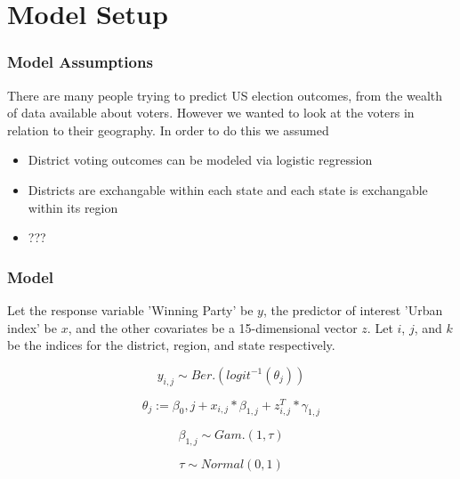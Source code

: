 \documentclass{beamer}
\begin{document}




\section{Model Setup}
\begin{frame}
  \frametitle{Model Assumptions}
  There are many people trying to predict US election outcomes, from the wealth of data available about voters. However we wanted to look at the voters in relation to their geography. In order to do this we assumed 
  \begin{itemize}
    \item District voting outcomes can be modeled via logistic regression 
    \item Districts are exchangable within each state and each state is exchangable within its region
    \item ??? 
  \end{itemize}
  \end{frame}

\begin{frame}
\frametitle{Model}
Let the response variable 'Winning Party' be \(y\), the predictor of interest 'Urban index' be \(x\), and the other covariates be a 15-dimensional vector \(z\). Let \(i\), \(j\), and \(k\) be the indices for the district, region, and state respectively. 

\[y_{i, j} \sim Ber.(logit^{-1}(\theta_{j}))\]

\[\theta_j := \beta_0, j + x_{i,j} * \beta_{1,j}  + z_{i, j}^T * \gamma_{1,j}\]

\[\beta_{1,j} \sim Gam.(1, \tau)\]

\[\tau \sim Normal(0, 1) \]  %


\end{frame}
\end{document}
